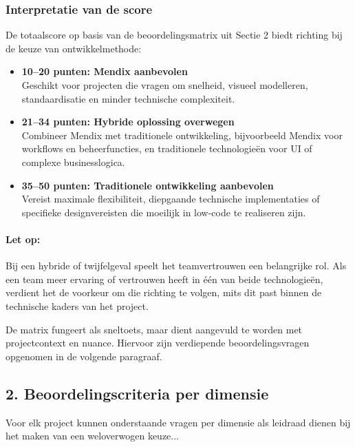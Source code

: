 \subsubsection{Interpretatie van de score}
De totaalscore op basis van de beoordelingsmatrix uit Sectie 2 biedt richting bij de keuze van ontwikkelmethode:

\begin{itemize}
    \item \textbf{10–20 punten: Mendix aanbevolen} \\
    Geschikt voor projecten die vragen om snelheid, visueel modelleren, standaardisatie en minder technische complexiteit.
    
    \item \textbf{21–34 punten: Hybride oplossing overwegen} \\
    Combineer Mendix met traditionele ontwikkeling, bijvoorbeeld Mendix voor workflows en beheerfuncties, en traditionele technologieën voor UI of complexe businesslogica.
    
    \item \textbf{35–50 punten: Traditionele ontwikkeling aanbevolen} \\
    Vereist maximale flexibiliteit, diepgaande technische implementaties of specifieke designvereisten die moeilijk in low-code te realiseren zijn.
\end{itemize}

\paragraph{Let op:} Bij een hybride of twijfelgeval speelt het teamvertrouwen een belangrijke rol. Als een team meer ervaring of vertrouwen heeft in één van beide technologieën, verdient het de voorkeur om die richting te volgen, mits dit past binnen de technische kaders van het project.

De matrix fungeert als sneltoets, maar dient aangevuld te worden met projectcontext en nuance. Hiervoor zijn verdiepende beoordelingsvragen opgenomen in de volgende paragraaf.

\subsection{2. Beoordelingscriteria per dimensie}
Voor elk project kunnen onderstaande vragen per dimensie als leidraad dienen bij het maken van een weloverwogen keuze...


